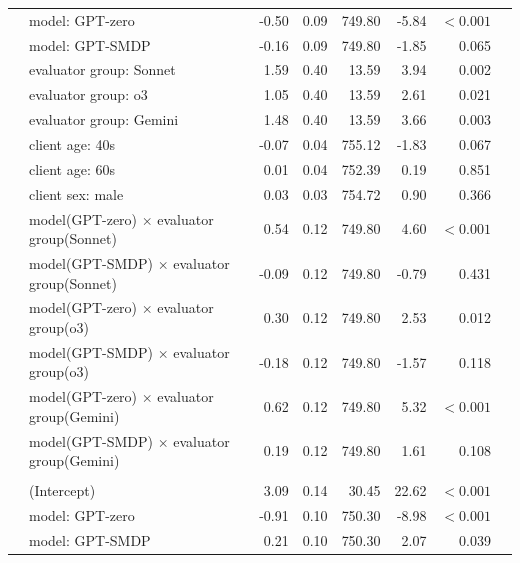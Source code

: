 \documentclass{wiley-article}
\begin{document}
{\begin{longtable}{@{}l p{} rrrrrr@{}}
        & model: GPT-zero                                         & -0.50 & 0.09 & 749.80 &  -5.84 & $<\!0.001$ \\
        & model: GPT-SMDP                                         & -0.16 & 0.09 & 749.80 &  -1.85 & 0.065 \\
        & evaluator group: Sonnet                                 &  1.59 & 0.40 &  13.59 &   3.94 & 0.002 \\
        & evaluator group: o3                                     &  1.05 & 0.40 &  13.59 &   2.61 & 0.021 \\
        & evaluator group: Gemini                                 &  1.48 & 0.40 &  13.59 &   3.66 & 0.003 \\
        & client age: 40s                                         & -0.07 & 0.04 & 755.12 &  -1.83 & 0.067 \\
        & client age: 60s                                         &  0.01 & 0.04 & 752.39 &   0.19 & 0.851 \\
        & client sex: male                                        &  0.03 & 0.03 & 754.72 &   0.90 & 0.366 \\
        & model(GPT-zero) $\times$ evaluator group(Sonnet)        &  0.54 & 0.12 & 749.80 &   4.60 & $<\!0.001$ \\
        & model(GPT-SMDP) $\times$ evaluator group(Sonnet)        & -0.09 & 0.12 & 749.80 &  -0.79 & 0.431 \\
        & model(GPT-zero) $\times$ evaluator group(o3)            &  0.30 & 0.12 & 749.80 &   2.53 & 0.012 \\
        & model(GPT-SMDP) $\times$ evaluator group(o3)            & -0.18 & 0.12 & 749.80 &  -1.57 & 0.118 \\
        & model(GPT-zero) $\times$ evaluator group(Gemini)        &  0.62 & 0.12 & 749.80 &   5.32 & $<\!0.001$ \\
        & model(GPT-SMDP) $\times$ evaluator group(Gemini)        &  0.19 & 0.12 & 749.80 &   1.61 & 0.108 \\
      \addlinespace
      \multicolumn{7}{l}{\textbf{PAR}}\\
        & (Intercept)                                             &  3.09 & 0.14 &  30.45 &  22.62 & $<\!0.001$ \\
        & model: GPT-zero                                         & -0.91 & 0.10 & 750.30 &  -8.98 & $<\!0.001$ \\
        & model: GPT-SMDP                                         &  0.21 & 0.10 & 750.30 &   2.07 & 0.039 \\

\end{longtable}}
\end{document}
